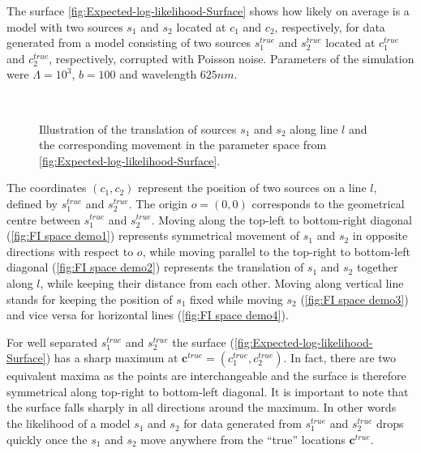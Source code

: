 The surface \autoref{fig:Expected-log-likelihood-Surface} shows how likely on average is a model with two sources $s_1$ and $s_2$ located at $c_1$ and $c_2$, respectively, for data generated from a model consisting of two sources $s_1^{true}$ and $s_2^{true}$ located at $c_1^{true}$ and $c_2^{true}$, respectively, corrupted with Poisson noise. Parameters of the simulation were $\Lambda=10^3$, $b=100$ and wavelength $625 \unit{nm}$.

\begin{figure}[bt]
	\newcommand{\wf}{.48\textwidth}
	\centering
	 \\
	\caption{Illustration of the translation of sources $s_1$ and $s_2$ along line $l$ and the corresponding movement in the parameter space from \autoref{fig:Expected-log-likelihood-Surface}.}
	\label{fig:FI space demo}
\end{figure}
%
The coordinates $(c_1,c_2)$ represent the position of two sources on a line $l$, defined by $s_1^{true}$ and  $s_2^{true}$. The origin $o=(0,0)$ corresponds to the geometrical centre between $s_1^{true}$ and $s_2^{true}$. Moving along the top-left to bottom-right diagonal (\autoref{fig:FI space demo1}) represents symmetrical movement of $s_1$ and $s_2$  in opposite directions with respect to $o$, while moving parallel to the top-right to bottom-left diagonal (\autoref{fig:FI space demo2}) represents the translation of $s_1$ and $s_2$ together along $l$, while keeping their distance from each other. Moving along vertical line stands for keeping the position of $s_1$ fixed while moving $s_2$ (\autoref{fig:FI space demo3}) and vice versa for horizontal lines (\autoref{fig:FI space demo4}).

For well separated $s_1^{true}$ and $s_2^{true}$ the surface (\autoref{fig:Expected-log-likelihood-Surface}\aaa) has a sharp maximum at $\bm{c}^{true}=(c_1^{true},c_2^{true})$. In fact, there are two equivalent maxima as the points are interchangeable and the surface is therefore symmetrical along top-right to bottom-left diagonal. It is important to note that the surface falls sharply in all directions around the maximum. In other words the likelihood of a model $s_1$ and $s_2$ for data generated from $s_1^{true}$ and $s_2^{true}$ drops quickly once the $s_1$ and $s_2$ move anywhere from the ``true'' locations $\bm{c}^{true}$.

